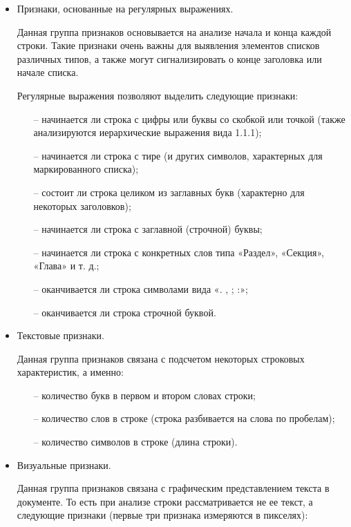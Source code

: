 \documentclass{ProcISPRAS}
\begin{document}
\begin{itemize}

  \item Признаки, основанные на регулярных выражениях.

  Данная группа признаков основывается на анализе начала и конца каждой строки. Такие признаки очень важны для выявления элементов списков различных типов, а также могут сигнализировать о конце заголовка или начале списка.

  Регулярные выражения позволяют выделить следующие признаки:
  \begin{itemize}

    \item[--] начинается ли строка с цифры или буквы со скобкой или точкой (также анализируются иерархические выражения вида 1.1.1);
    \item[--] начинается ли строка с тире (и других символов, характерных для маркированного списка);
    \item[--] состоит ли строка целиком из заглавных букв (характерно для некоторых заголовков);
    \item[--] начинается ли строка с заглавной (строчной) буквы;
    \item[--] начинается ли строка с конкретных слов типа «Раздел», «Секция», «Глава» и т. д.;
    \item[--] оканчивается ли строка символами вида «. , ; :»;
    \item[--] оканчивается ли строка строчной буквой.

  \end{itemize}

  \item Текстовые признаки.

  Данная группа признаков связана с подсчетом некоторых строковых характеристик, а именно:

  \begin{itemize}

    \item[--] количество букв в первом и втором словах строки;
    \item[--] количество слов в строке (строка разбивается на слова по пробелам);
    \item[--] количество символов в строке (длина строки).

  \end{itemize}

  \item Визуальные признаки.
  
  Данная группа признаков связана с графическим представлением текста в документе. То есть при анализе строки рассматривается не ее текст, а следующие признаки (первые три признака измеряются в пикселях):


\end{itemize}
\end{document}

